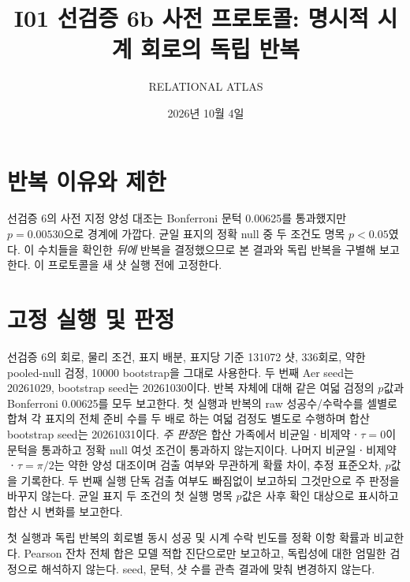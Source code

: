 \documentclass[11pt,a4paper]{article}
\title{I01 선검증 6b 사전 프로토콜: 명시적 시계 회로의 독립 반복}
\author{RELATIONAL ATLAS}
\date{2026년 10월 4일}
\begin{document}
\maketitle

\section{반복 이유와 제한}
선검증 6의 사전 지정 양성 대조는 Bonferroni 문턱 0.00625를
통과했지만 $p=0.00530$으로 경계에 가깝다. 균일 표지의 정확
null 중 두 조건도 명목 $p<0.05$였다. 이 수치들을 확인한
\emph{뒤에} 반복을 결정했으므로 본 결과와 독립 반복을 구별해
보고한다. 이 프로토콜을 새 샷 실행 전에 고정한다.

\section{고정 실행 및 판정}
선검증 6의 회로, 물리 조건, 표지 배분, 표지당 기준 131072 샷,
336회로, 약한 pooled-null 검정, 10000 bootstrap을 그대로 사용한다.
두 번째 Aer seed는 20261029, bootstrap seed는 20261030이다.
반복 자체에 대해 같은 여덟 검정의 $p$값과 Bonferroni 0.00625를
모두 보고한다. 첫 실행과 반복의 raw 성공수/수락수를 셀별로
합쳐 각 표지의 전체 준비 수를 두 배로 하는 여덟 검정도
별도로 수행하며 합산 bootstrap seed는 20261031이다.
\emph{주 판정}은 합산 가족에서 비균일ㆍ비제약ㆍ$\tau=0$이
문턱을 통과하고 정확 null 여섯 조건이 통과하지 않는지이다.
나머지 비균일ㆍ비제약ㆍ$\tau=\pi/2$는 약한 양성 대조이며
검출 여부와 무관하게 확률 차이, 추정 표준오차, $p$값을 기록한다.
두 번째 실행 단독 검출 여부도 빠짐없이 보고하되 그것만으로
주 판정을 바꾸지 않는다. 균일 표지 두 조건의 첫 실행 명목
$p$값은 사후 확인 대상으로 표시하고 합산 시 변화를 보고한다.

첫 실행과 독립 반복의 회로별 동시 성공 및 시계 수락 빈도를
정확 이항 확률과 비교한다. Pearson 잔차 전체 합은 모델 적합
진단으로만 보고하고, 독립성에 대한 엄밀한 검정으로 해석하지
않는다. seed, 문턱, 샷 수를 관측 결과에 맞춰 변경하지 않는다.
\end{document}
